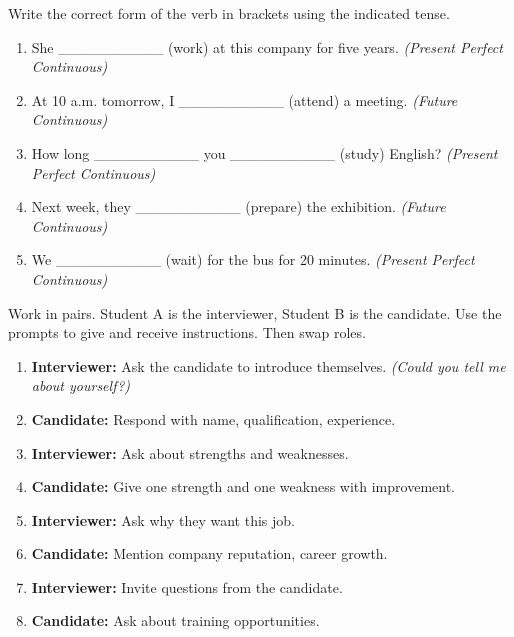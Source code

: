 \documentclass[11pt]{article}
\newcounter{popsec}
\newcounter{popsub}
\newcommand{\courssub}[1]{%
  \stepcounter{popsub}%
  \par\vspace{9pt}\noindent{\popxbold\fontsize{11.5}{13}\selectfont\color{popink}{\color{poporange}\thepopsec.\thepopsub}\hspace{6pt}#1}\par\nopagebreak\vspace{4pt}
}
\begin{document}
\begin{exercice}
Write the correct form of the verb in brackets using the indicated tense.
\begin{enumerate}
    \item She \_\_\_\_\_\_\_\_\_\_ (work) at this company for five years. \emph{(Present Perfect Continuous)}
    \item At 10 a.m. tomorrow, I \_\_\_\_\_\_\_\_\_\_ (attend) a meeting. \emph{(Future Continuous)}
    \item How long \_\_\_\_\_\_\_\_\_\_ you \_\_\_\_\_\_\_\_\_\_ (study) English? \emph{(Present Perfect Continuous)}
    \item Next week, they \_\_\_\_\_\_\_\_\_\_ (prepare) the exhibition. \emph{(Future Continuous)}
    \item We \_\_\_\_\_\_\_\_\_\_ (wait) for the bus for 20 minutes. \emph{(Present Perfect Continuous)}
\end{enumerate}
\end{exercice}

\courssub{Je m'entraîne}

\begin{exercice}
Work in pairs. Student A is the interviewer, Student B is the candidate. Use the prompts to give and receive instructions. Then swap roles.
\begin{enumerate}
    \item \textbf{Interviewer:} Ask the candidate to introduce themselves. \emph{(Could you tell me about yourself?)}
    \item \textbf{Candidate:} Respond with name, qualification, experience.
    \item \textbf{Interviewer:} Ask about strengths and weaknesses.
    \item \textbf{Candidate:} Give one strength and one weakness with improvement.
    \item \textbf{Interviewer:} Ask why they want this job.
    \item \textbf{Candidate:} Mention company reputation, career growth.
    \item \textbf{Interviewer:} Invite questions from the candidate.
    \item \textbf{Candidate:} Ask about training opportunities.
\end{enumerate}
\end{exercice}
\end{document}
